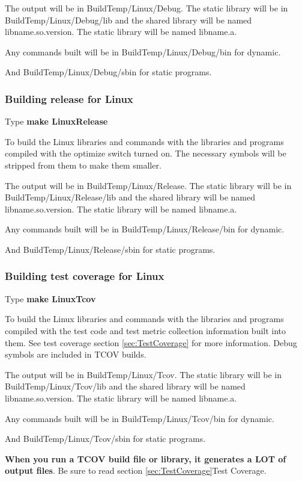 The output will be in BuildTemp/Linux/Debug.
The static library will be in BuildTemp/Linux/Debug/lib
and the shared library will be named lib{name}.so.{version}.
The static library will be named lib{name}.a.
  
Any commands built will be in BuildTemp/Linux/Debug/bin
for dynamic.

And BuildTemp/Linux/Debug/sbin for static programs.

\subsubsection{Building release for Linux}
Type \textbf{make LinuxRelease}

To build the Linux libraries and commands with the libraries
and programs compiled with the optimize switch turned on.
The necessary symbols will be stripped from them to make
them smaller.

The output will be in BuildTemp/Linux/Release.
The static library will be in BuildTemp/Linux/Release/lib
and the shared library will be named lib{name}.so.{version}.
The static library will be named lib{name}.a.
  
Any commands built will be in BuildTemp/Linux/Release/bin
for dynamic.

And BuildTemp/Linux/Release/sbin for static programs.

\subsubsection{Building test coverage for Linux}
Type \textbf{make LinuxTcov}

To build the Linux libraries and commands with the libraries
and programs compiled with the test code and test metric
collection information built into them.
See test coverage section \ref{sec:TestCoverage} for more information.
Debug symbols are included in TCOV builds.

The output will be in BuildTemp/Linux/Tcov.
The static library will be in BuildTemp/Linux/Tcov/lib
and the shared library will be named lib{name}.so.{version}.
The static library will be named lib{name}.a.

Any commands built will be in BuildTemp/Linux/Tcov/bin
for dynamic.

And BuildTemp/Linux/Tcov/sbin for static programs.

\textbf{When you run a TCOV build file or library, it generates a LOT of  output files}. Be sure to read section \ref{sec:TestCoverage}{Test Coverage}.
  
